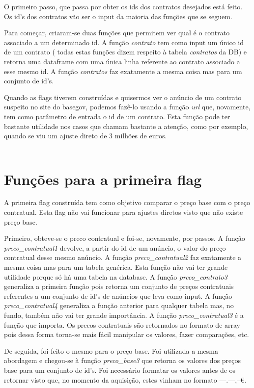 O primeiro passo, que passa por obter os ids dos contratos desejados está feito. Os id's dos contratos vão ser o input da maioria das funções que se seguem. 

Para começar, criaram-se duas funções que permitem ver qual é o contrato associado a um determinado id. A função \textit{contrato} tem como input um único id de um contrato ( todas estas funções dizem respeito à tabela \textit{contratos} da DB) e retorna uma dataframe com uma única linha referente ao contrato associado a esse mesmo id. A função \textit{contratos} faz exatamente a mesma coisa mas para um conjunto de id's. 

Quando as flags tiverem construídas e quisermos ver o anúncio de um contrato suspeito no site do basegov, podemos fazê-lo usando a função \textit{url} que, novamente, tem como parâmetro de entrada o id de um contrato. Esta função pode ter bastante utilidade nos casos que chamam bastante a atenção, como por exemplo, quando se viu um ajuste direto de 3 milhões de euros. \\
\\

\section{Funções para a primeira flag}

A primeira flag construída tem como objetivo comparar o preço base com o preço contratual. Esta flag não vai funcionar para ajustes diretos visto que não existe preço base. 

Primeiro, obteve-se o preco contratual e foi-se, novamente, por passos. 
A função \textit{preco\_contratual1} devolve, a partir do id de um anúncio, o valor do preço contratual desse mesmo anúncio. A função \textit{preco\_contratual2} faz exatamente a mesma coisa mas para um tabela genérica. Esta função não vai ter grande utilidade porque só há uma tabela na database. A função \textit{preco\_contrato3} generaliza a primeira função pois retorna um conjunto de preços contratuais referentes a um conjunto de id's de anúncios que leva como input. A função \textit{preco\_contratual4} generaliza a função anterior para qualquer tabela mas, no fundo, também não vai ter grande importância. A função \textit{preco\_contratual3} é a função que importa. Os precos contratuais são retornados no formato de array pois dessa forma torna-se mais fácil manipular os valores, fazer comparações, etc. 

De seguida, foi feito o mesmo para o preço base. Foi utilizada a mesma abordagem e chegou-se à função \textit{preco\_base3} que retorna os valores dos preços base para um conjunto de id's. Foi necessário formatar os valores antes de os retornar visto que, no momento da aquisição, estes vinham no formato ---.---,--€. 

